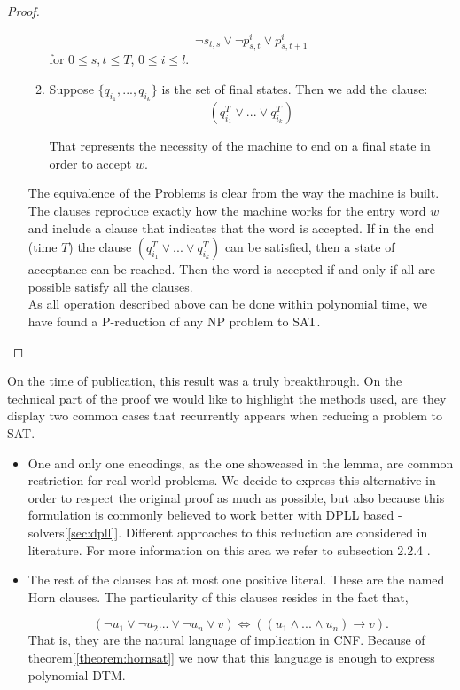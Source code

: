 \begin{proof}
\begin{itemize}
\begin{enumerate}
    $$\neg s_{t,s} \lor \neg p_{s,t}^i \lor  p_{s,t+1}^i  $$
    for $0 \le s,t \le T$, $0 \le i \le l$.
  \item Suppose $\{q_{i_1},...,q_{i_k}\}$ is the set of final states. Then we add the clause:
    $$ (q_{i_1}^T \lor ... \lor q_{i_k}^T)$$

    That represents the necessity of the machine to end on a final state in order to accept $w$.
    \end{enumerate}


    The equivalence of the Problems is clear from the way the machine is built. The clauses reproduce exactly how the machine works for the entry word $w$ and include a clause that indicates that the word is accepted. If in the end (time $T$) the clause $ (q_{i_1}^T \lor ... \lor q_{i_k}^T)$ can be satisfied, then a state of acceptance can be reached. Then the word is accepted if and only if all are possible satisfy all the clauses.\\

As all operation described above can be done within polynomial time, we have found a P-reduction of any NP problem to SAT.
  \end{itemize}
\end{proof}


On the time of publication, this result was a truly breakthrough. On the technical part of the proof we would like to highlight the methods used, are they display two common cases that recurrently appears when reducing a problem to SAT.

\begin{itemize}
\item One and only one encodings, as the one showcased in the lemma, are common restriction for real-world problems. We decide to express this alternative in order to respect the original proof as much as possible, but also because this formulation is commonly believed to work better with DPLL based - solvers[\ref{sec:dpll}]. Different approaches to this reduction are considered in literature. For more information on this area we refer to subsection 2.2.4 \cite{darwiche2009complete}.

\item The rest of the clauses has at most one positive literal. These are the named Horn clauses. The particularity of this clauses resides in the fact that,

  $$(\neg u_1 \lor \neg u_2 ... \lor \neg u_n \lor v) \iff ((u_1\land ... \land u_n) \to v).$$
  That is, they are the natural language of implication in CNF. Because of theorem[\ref{theorem:hornsat}] we now that this language is enough to express polynomial DTM.
\end{itemize}





